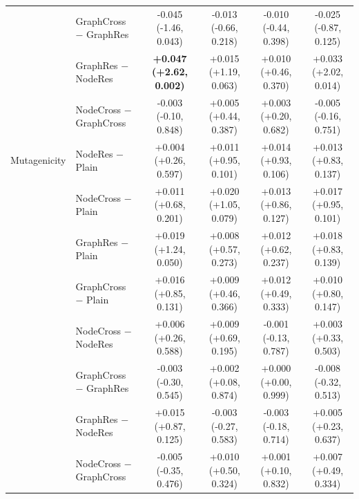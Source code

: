 \begin{table}[t]
\begin{tabular}{llcccc}
 & GraphCross $-$ GraphRes & -0.045 (-1.46, 0.043) & -0.013 (-0.66, 0.218) & -0.010 (-0.44, 0.398) & -0.025 (-0.87, 0.125) \\
 & GraphRes $-$ NodeRes & \textbf{+0.047 (+2.62, 0.002)} & +0.015 (+1.19, 0.063) & +0.010 (+0.46, 0.370) & +0.033 (+2.02, 0.014) \\
 & NodeCross $-$ GraphCross & -0.003 (-0.10, 0.848) & +0.005 (+0.44, 0.387) & +0.003 (+0.20, 0.682) & -0.005 (-0.16, 0.751) \\
\midrule
Mutagenicity & NodeRes $-$ Plain & +0.004 (+0.26, 0.597) & +0.011 (+0.95, 0.101) & +0.014 (+0.93, 0.106) & +0.013 (+0.83, 0.137) \\
 & NodeCross $-$ Plain & +0.011 (+0.68, 0.201) & +0.020 (+1.05, 0.079) & +0.013 (+0.86, 0.127) & +0.017 (+0.95, 0.101) \\
 & GraphRes $-$ Plain & +0.019 (+1.24, 0.050) & +0.008 (+0.57, 0.273) & +0.012 (+0.62, 0.237) & +0.018 (+0.83, 0.139) \\
 & GraphCross $-$ Plain & +0.016 (+0.85, 0.131) & +0.009 (+0.46, 0.366) & +0.012 (+0.49, 0.333) & +0.010 (+0.80, 0.147) \\
 & NodeCross $-$ NodeRes & +0.006 (+0.26, 0.588) & +0.009 (+0.69, 0.195) & -0.001 (-0.13, 0.787) & +0.003 (+0.33, 0.503) \\
 & GraphCross $-$ GraphRes & -0.003 (-0.30, 0.545) & +0.002 (+0.08, 0.874) & +0.000 (+0.00, 0.999) & -0.008 (-0.32, 0.513) \\
 & GraphRes $-$ NodeRes & +0.015 (+0.87, 0.125) & -0.003 (-0.27, 0.583) & -0.003 (-0.18, 0.714) & +0.005 (+0.23, 0.637) \\
 & NodeCross $-$ GraphCross & -0.005 (-0.35, 0.476) & +0.010 (+0.50, 0.324) & +0.001 (+0.10, 0.832) & +0.007 (+0.49, 0.334) \\
\bottomrule
\end{tabular}
\end{table}
